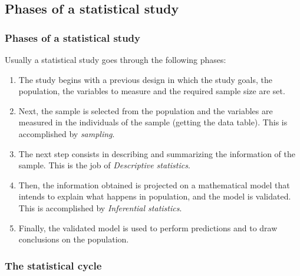 \subsection{Phases of a statistical study}

\begin{frame}
\frametitle{Phases of a statistical study}
Usually a statistical study goes through the following phases:  
\begin{enumerate}
\item The study begins with a previous design in which the study goals, the population, the variables to
measure and the required sample size are set.
\item Next, the sample is selected from the population and the variables are measured in the individuals of the sample
(getting the data table).
This is accomplished by \emph{sampling}.  
\item The next step consists in describing and summarizing the information of the sample. 
This is the job of \emph{Descriptive statistics}. 
\item Then, the information obtained is projected on a mathematical model that intends to explain what happens in
population, and the model is validated. 
This is accomplished by \emph{Inferential statistics}.
\item Finally, the validated model is used to perform predictions and to draw conclusions on the population.
\end{enumerate}
\end{frame}


\begin{frame}
\frametitle{The statistical cycle}
\begin{center}
\resizebox{0.85\textwidth}{!}{}
\end{center}
\end{frame}

